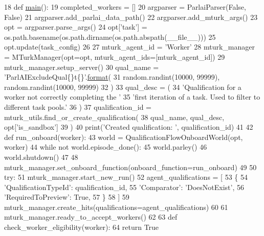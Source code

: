 \begin{DoxyCode}
18 \textcolor{keyword}{def }\hyperlink{namespaceprojects_1_1wizard__of__wikipedia_1_1mturk__evaluation__task_1_1run_ad3ab2c71f8083c3112815c0b363d316b}{main}():
19     completed\_workers = []
20     argparser = ParlaiParser(\textcolor{keyword}{False}, \textcolor{keyword}{False})
21     argparser.add\_parlai\_data\_path()
22     argparser.add\_mturk\_args()
23     opt = argparser.parse\_args()
24     opt[\textcolor{stringliteral}{'task'}] = os.path.basename(os.path.dirname(os.path.abspath(\_\_file\_\_)))
25     opt.update(task\_config)
26 
27     mturk\_agent\_id = \textcolor{stringliteral}{'Worker'}
28     mturk\_manager = MTurkManager(opt=opt, mturk\_agent\_ids=[mturk\_agent\_id])
29     mturk\_manager.setup\_server()
30     qual\_name = \textcolor{stringliteral}{'ParlAIExcludeQual\{\}t\{\}'}.\hyperlink{namespaceparlai_1_1chat__service_1_1services_1_1messenger_1_1shared__utils_a32e2e2022b824fbaf80c747160b52a76}{format}(
31         random.randint(10000, 99999), random.randint(10000, 99999)
32     )
33     qual\_desc = (
34         \textcolor{stringliteral}{'Qualification for a worker not correctly completing the '}
35         \textcolor{stringliteral}{'first iteration of a task. Used to filter to different task pools.'}
36     )
37     qualification\_id = mturk\_utils.find\_or\_create\_qualification(
38         qual\_name, qual\_desc, opt[\textcolor{stringliteral}{'is\_sandbox'}]
39     )
40     print(\textcolor{stringliteral}{'Created qualification: '}, qualification\_id)
41 
42     \textcolor{keyword}{def }run\_onboard(worker):
43         world = QualificationFlowOnboardWorld(opt, worker)
44         \textcolor{keywordflow}{while} \textcolor{keywordflow}{not} world.episode\_done():
45             world.parley()
46         world.shutdown()
47 
48     mturk\_manager.set\_onboard\_function(onboard\_function=run\_onboard)
49 
50     \textcolor{keywordflow}{try}:
51         mturk\_manager.start\_new\_run()
52         agent\_qualifications = [
53             \{
54                 \textcolor{stringliteral}{'QualificationTypeId'}: qualification\_id,
55                 \textcolor{stringliteral}{'Comparator'}: \textcolor{stringliteral}{'DoesNotExist'},
56                 \textcolor{stringliteral}{'RequiredToPreview'}: \textcolor{keyword}{True},
57             \}
58         ]
59         mturk\_manager.create\_hits(qualifications=agent\_qualifications)
60 
61         mturk\_manager.ready\_to\_accept\_workers()
62 
63         \textcolor{keyword}{def }check\_worker\_eligibility(worker):
64             \textcolor{keywordflow}{return} \textcolor{keyword}{True}

\end{DoxyCode}
